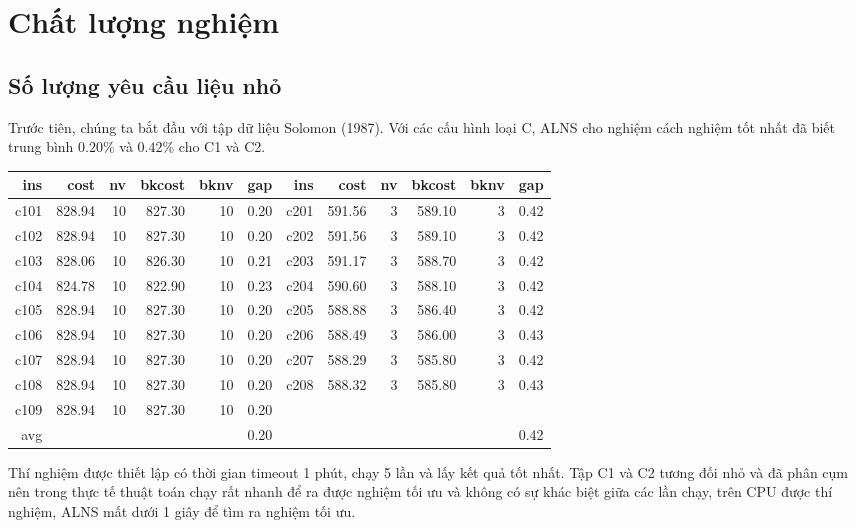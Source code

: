 \section{Chất lượng nghiệm}

\subsection{Số lượng yêu cầu liệu nhỏ}

Trước tiên, chúng ta bắt đầu với tập dữ liệu Solomon (1987). Với các cấu hình loại C, ALNS cho nghiệm cách nghiệm tốt nhất đã biết trung bình $0.20\%$ và $0.42\%$ cho C1 và C2. 

\begin{table}[caption={Kết quả đo với tập Solomon C \\
  \scriptsize \textit{ins: cấu hình, cost: chi phí thu được với ALNS, nv: số xe được sử dụng, bkcost: chi phí tốt nhất đã biết, bknv: số xe tốt nhất đã biết, gap (\%): khoảng cách so với nghiệm tốt nhất đã biết}}, label=exp:solomonC]
  \begin{adjustbox}{width=1\textwidth}
  \small
  \begin{tabularx}{\textwidth}{rrrrrrrrrrrr}
  \hline
  ins & cost & nv & bkcost & bknv & gap & ins & cost & nv & bkcost & bknv & gap \\ \hline
  c101 & 828.94 & 10 & 827.30 & 10 & 0.20 & c201 & 591.56 & 3 & 589.10 & 3 & 0.42 \\ \hline
  c102 & 828.94 & 10 & 827.30 & 10 & 0.20 & c202 & 591.56 & 3 & 589.10 & 3 & 0.42 \\ \hline
  c103 & 828.06 & 10 & 826.30 & 10 & 0.21 & c203 & 591.17 & 3 & 588.70 & 3 & 0.42 \\ \hline
  c104 & 824.78 & 10 & 822.90 & 10 & 0.23 & c204 & 590.60 & 3 & 588.10 & 3 & 0.42 \\ \hline
  c105 & 828.94 & 10 & 827.30 & 10 & 0.20 & c205 & 588.88 & 3 & 586.40 & 3 & 0.42 \\ \hline
  c106 & 828.94 & 10 & 827.30 & 10 & 0.20 & c206 & 588.49 & 3 & 586.00 & 3 & 0.43 \\ \hline
  c107 & 828.94 & 10 & 827.30 & 10 & 0.20 & c207 & 588.29 & 3 & 585.80 & 3 & 0.42 \\ \hline
  c108 & 828.94 & 10 & 827.30 & 10 & 0.20 & c208 & 588.32 & 3 & 585.80 & 3 & 0.43 \\ \hline
  c109 & 828.94 & 10 & 827.30 & 10 & 0.20 &  &  &  &  &  &  \\ \hline
  avg & & & & & 0.20 &  &  &  &  & & 0.42 \\ \hline
  \end{tabularx}
  \end{adjustbox}
  \end{table}
  Thí nghiệm được thiết lập có thời gian timeout 1 phút, chạy 5 lần và lấy kết quả tốt nhất. Tập C1 và C2 tương đối nhỏ và đã phân cụm nên trong thực tế thuật toán chạy rất nhanh để ra được nghiệm tối ưu và không có sự khác biệt giữa các lần chạy, trên CPU được thí nghiệm, ALNS mất dưới 1 giây để tìm ra nghiệm tối ưu.


